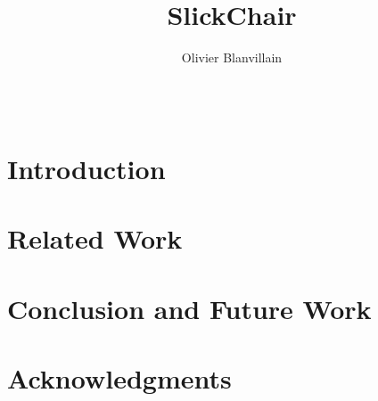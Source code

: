 \documentclass{acm_proc_article-sp}
\begin{document}
  \title{SlickChair}


  \author{
    \alignauthor
    Olivier Blanvillain\\
           \\
           \\
    \alignauthor
  }
  
  \maketitle

  \begin{abstract}
    
  \end{abstract}


  \section{Introduction}
  \label{introduction}
  
  
  \section{Related Work}
  \label{relatedwork}
  
  
  \section{Conclusion and Future Work}
  \label{conclusionandfuturework}
  
  
  \section{Acknowledgments}
  \label{acknowledgments}
  

  \balance

  
  
  
\end{document}
